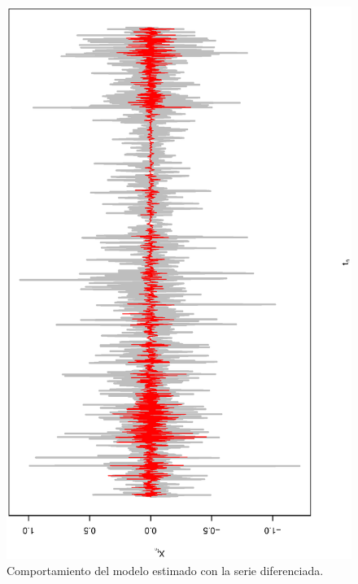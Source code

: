 \begin{figure}[h]
\begin{minipage}{0.45\textwidth}
    \includegraphics[width=0.8\linewidth,angle = 270]{Kap3/Fig_Cap3/example_data_diff_estimation.eps}
    \caption{Comportamiento del modelo estimado con la serie diferenciada.}
    \label{fig:example_diff_fit}
    \end{minipage}
\end{figure}



